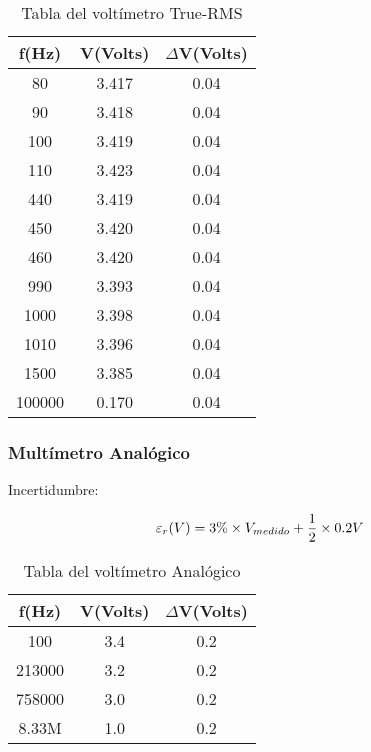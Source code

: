 \documentclass{article}
\begin{document}
\begin{table}[!hbt]
	\begin{center}
	\begin{tabular}{|c|c|c|}\hline
	\textbf{f(Hz)} & \textbf{V(Volts)} & \textbf{$\Delta$V(Volts)} \\ \hline
	80 & 3.417 & 0.04\\ \hline
    90 & 3.418 & 0.04\\ \hline
    100 & 3.419 & 0.04\\ \hline
	110 & 3.423 & 0.04\\ \hline
	440 & 3.419 & 0.04\\ \hline
	450 & 3.420 & 0.04\\ \hline
	460 & 3.420 & 0.04\\ \hline
	990 & 3.393 & 0.04\\ \hline
	1000 & 3.398 & 0.04\\ \hline
	1010& 3.396 & 0.04\\ \hline
	1500 & 3.385 & 0.04\\ \hline
	100000 & 0.170 & 0.04\\ \hline
	\end{tabular}
	\caption{Tabla del voltímetro True-RMS}
	\end{center}
\end{table}
\bigskip

\subsubsection*{Multímetro Analógico}

Incertidumbre:

\begin{equation}
 	\varepsilon_r(V) = 3\%\times V_{medido} + {1 \over 2}\times 0.2V
\end{equation}
\medskip

\begin{table}[!hbt]
	\begin{center}
	\begin{tabular}{|c|c|c|}\hline
	\textbf{f(Hz)} & \textbf{V(Volts)} & \textbf{$\Delta$V(Volts)} \\ \hline
	100 & 3.4 & 0.2\\ \hline
    213000 & 3.2 & 0.2\\ \hline
    758000 & 3.0 & 0.2\\ \hline
	8.33M & 1.0 & 0.2\\ \hline
	\end{tabular}
	\caption{Tabla del voltímetro Analógico}
	\end{center}
\end{table}
\end{document}
